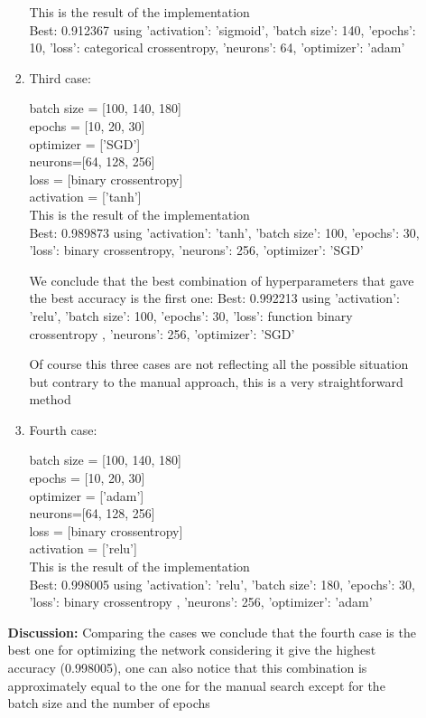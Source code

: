 \documentclass[12pt,a4paper]{report}
\begin{document}
\begin{enumerate}
\begin{enumerate}
\begin{enumerate}
This is the  result of the implementation \\
Best: 0.912367 using {'activation': 'sigmoid', 'batch size': 140, 'epochs': 10, 'loss': categorical crossentropy, 'neurons': 64, 'optimizer': 'adam'}


\item Third case:

batch size = [100,  140,  180]\\
epochs = [10, 20, 30]\\
optimizer = ['SGD']\\
neurons=[64, 128, 256]\\
loss = [binary crossentropy]\\
activation = ['tanh']
\\

This is the  result of the implementation \\
Best: 0.989873 using {'activation': 'tanh', 'batch size': 100, 'epochs': 30, 'loss': binary crossentropy, 'neurons': 256, 'optimizer': 'SGD'}

We conclude that the best combination of hyperparameters that gave the best accuracy is the first one:
Best: 0.992213 using {'activation': 'relu', 'batch size': 100, 'epochs': 30, 'loss': function binary crossentropy , 'neurons': 256, 'optimizer': 'SGD'}

Of course this three cases are not reflecting all the possible situation but contrary to the manual approach, this is a very straightforward method 
\\

\item Fourth case:

batch size = [100,  140,  180]\\
epochs = [10, 20, 30]\\
optimizer = ['adam']\\
neurons=[64, 128, 256]\\
loss = [binary crossentropy]\\
activation = ['relu']\\

This is the  result of the implementation \\
Best: 0.998005 using {'activation': 'relu', 'batch size': 180, 'epochs': 30, 'loss': binary crossentropy , 'neurons': 256, 'optimizer': 'adam'}

\end{enumerate}

\textbf{Discussion:}
Comparing the cases we conclude that the fourth case is the best one for optimizing the network considering it give the highest accuracy (0.998005), one can also notice that this combination is approximately equal to the one for the manual search except for the batch size and the number of epochs 	  





\end{enumerate}
\end{enumerate}
\end{document}
